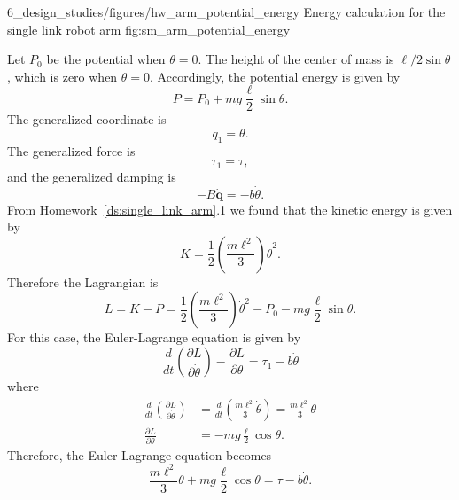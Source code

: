 
	{6_design_studies/figures/hw_arm_potential_energy}
	{Energy calculation for the single link robot arm}
	{fig:sm_arm_potential_energy}

Let $P_0$ be the potential when $\theta=0$.  The height of the center of mass is $\ell/2 \sin\theta$, which is zero when $\theta=0$.  Accordingly, the potential energy is given by
\[
P = P_0 + mg \frac{\ell}{2} \sin\theta.
\]
The generalized coordinate is 
\[
q_1= \theta.
\]
The generalized force is 
\[
\tau_1=\tau,
\]
and the generalized damping is 
\[
-B\dot{\mathbf{q}} = - b\dot{\theta}.
\]
From Homework~\ref{ds:single_link_arm}.1 we found that the kinetic energy is given by
\[
K=\frac{1}{2}\left(\frac{m\ell^2}{3}\right)\dot{\theta}^2.
\]
Therefore the Lagrangian is
\[
L = K - P = \frac{1}{2}\left(\frac{m\ell^2}{3}\right)\dot{\theta}^2 - P_0 - mg\frac{\ell}{2} \sin\theta.
\]
For this case, the Euler-Lagrange equation is given by
\[
\frac{d}{dt}\left(\frac{\partial L}{\partial \dot{\theta}}\right) - \frac{\partial L}{\partial \theta} = \tau_1 - b\dot{\theta}
\]
where
\begin{align*}
\frac{d}{dt}\left(\frac{\partial L}{\partial \dot{\theta}}\right) &= \frac{d}{dt}\left(\frac{m\ell^2}{3}\dot{\theta}\right) = \frac{m\ell^2}{3}\ddot{\theta} \\
\frac{\partial L}{\partial \theta} &= -mg\frac{\ell}{2}\cos\theta. 
\end{align*}
Therefore, the Euler-Lagrange equation becomes
\begin{equation}\label{eq:sm_arm_nonlinear_eom}
\frac{m\ell^2}{3}\ddot{\theta} + mg\frac{\ell}{2}\cos\theta = \tau - b\dot{\theta}.
\end{equation}
